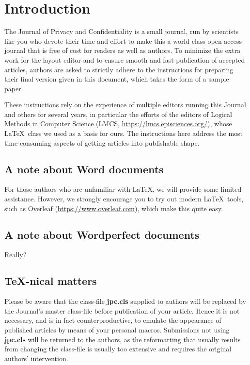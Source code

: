 \documentclass{jpc} %
\theoremstyle{plain}\newtheorem{satz}[thm]{Satz} %
\begin{document}
\maketitle

\section*{Introduction}\label{S:one}

  The Journal of Privacy and Confidentiality is a small journal, run
  by scientists like you who devote their time and effort to make this
  a world-class open access journal that is free of cost for readers
  as well as authors.  To minimize the extra work for the layout
  editor and to ensure smooth and fast publication of accepted
  articles, authors are asked to strictly adhere to the instructions
  for preparing their final version given in this document, which
  takes the form of a sample paper.

  These instructions rely on the experience of multiple editors running this
  Journal and others for several years, in particular the efforts of the editors of Logical Methods in Computer Science (LMCS, \url{https://lmcs.episciences.org/}), whose \LaTeX\  class we used as a basis for ours.  The instructions here address the most time-consuming
  aspects of getting articles into publishable shape. 
  
\subsection*{A note about Word documents}
For those authors who are unfamiliar with \LaTeX, we will provide some limited assistance. However, we strongly encourage you to try out modern \LaTeX\  tools, such as Overleaf (\url{https://www.overleaf.com}), which make this quite easy. 


\subsection*{A note about Wordperfect documents}
Really?

\subsection*{\TeX-nical matters}

  Please be aware that the class-file {\bf jpc.cls} supplied to 
  authors will be replaced by the Journal's master class-file before
  publication of your article.  Hence it is not necessary, and is in
  fact counterproductive, to emulate the appearance of published
  articles by means of your personal macros.  Submissions not using
  {\bf jpc.cls} will be returned to the authors, as the reformatting
  that usually results from changing the class-file is usually too
  extensive and requires the original authors' intervention.
\end{document}
